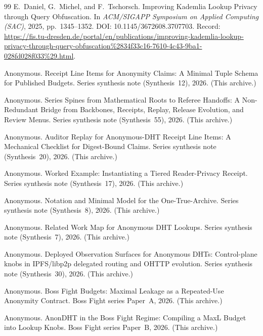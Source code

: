 \documentclass[11pt]{article}
\begin{document}
\begin{thebibliography}{99}
E.~Daniel, G.~Michel, and F.~Tschorsch.
\newblock Improving {Kademlia} Lookup Privacy through Query Obfuscation.
\newblock In \emph{ACM/SIGAPP Symposium on Applied Computing (SAC)}, 2025, pp.~1345--1352.
\newblock DOI: 10.1145/3672608.3707703.
\newblock Record: \url{https://fis.tu-dresden.de/portal/en/publications/improving-kademlia-lookup-privacy-through-query-obfuscation%2834f33c16-7610-4c43-9ba1-028fd028f033%29.html}.


Anonymous.
\newblock Receipt Line Items for Anonymity Claims: A Minimal Tuple Schema for Published Budgets.
\newblock Series synthesis note (Synthesis~12), 2026. (This archive.)

Anonymous.
\newblock Series Spines from Mathematical Roots to Referee Handoffs: A Non-Redundant Bridge from Backbones, Receipts, Replay, Release Evolution, and Review Menus.
\newblock Series synthesis note (Synthesis~55), 2026. (This archive.)

Anonymous.
\newblock Auditor Replay for Anonymous-DHT Receipt Line Items: A Mechanical Checklist for Digest-Bound Claims.
\newblock Series synthesis note (Synthesis~20), 2026. (This archive.)

Anonymous.
\newblock Worked Example: Instantiating a Tiered Reader-Privacy Receipt.
\newblock Series synthesis note (Synthesis~17), 2026. (This archive.)

Anonymous.
\newblock Notation and Minimal Model for the One-True-Archive.
\newblock Series synthesis note (Synthesis~8), 2026. (This archive.)

Anonymous.
\newblock Related Work Map for Anonymous {DHT} Lookups.
\newblock Series synthesis note (Synthesis~7), 2026. (This archive.)

Anonymous.
\newblock Deployed Observation Surfaces for Anonymous DHTs: Control-plane knobs in IPFS/libp2p delegated routing and OHTTP evolution.
\newblock Series synthesis note (Synthesis~30), 2026. (This archive.)


Anonymous.
\newblock Boss Fight Budgets: Maximal Leakage as a Repeated-Use Anonymity Contract.
\newblock Boss Fight series Paper~A, 2026. (This archive.)

Anonymous.
\newblock AnonDHT in the Boss Fight Regime: Compiling a MaxL Budget into Lookup Knobs.
\newblock Boss Fight series Paper~B, 2026. (This archive.)


\end{thebibliography}
\end{document}
